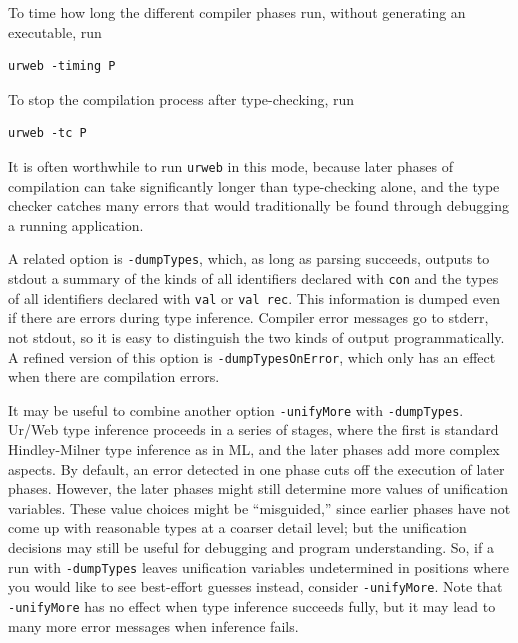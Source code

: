\documentclass{article}
\newcommand{\cd}[1]{\texttt{#1}}
\begin{document}
To time how long the different compiler phases run, without generating an executable, run
\begin{verbatim}
urweb -timing P
\end{verbatim}

To stop the compilation process after type-checking, run
\begin{verbatim}
urweb -tc P
\end{verbatim}
It is often worthwhile to run \cd{urweb} in this mode, because later phases of compilation can take significantly longer than type-checking alone, and the type checker catches many errors that would traditionally be found through debugging a running application.

A related option is \cd{-dumpTypes}, which, as long as parsing succeeds, outputs to stdout a summary of the kinds of all identifiers declared with \cd{con} and the types of all identifiers declared with \cd{val} or \cd{val rec}.  This information is dumped even if there are errors during type inference.  Compiler error messages go to stderr, not stdout, so it is easy to distinguish the two kinds of output programmatically.  A refined version of this option is \cd{-dumpTypesOnError}, which only has an effect when there are compilation errors.

It may be useful to combine another option \cd{-unifyMore} with \cd{-dumpTypes}.  Ur/Web type inference proceeds in a series of stages, where the first is standard Hindley-Milner type inference as in ML, and the later phases add more complex aspects.  By default, an error detected in one phase cuts off the execution of later phases.  However, the later phases might still determine more values of unification variables.  These value choices might be ``misguided,'' since earlier phases have not come up with reasonable types at a coarser detail level; but the unification decisions may still be useful for debugging and program understanding.  So, if a run with \cd{-dumpTypes} leaves unification variables undetermined in positions where you would like to see best-effort guesses instead, consider \cd{-unifyMore}.  Note that \cd{-unifyMore} has no effect when type inference succeeds fully, but it may lead to many more error messages when inference fails.
\end{document}
